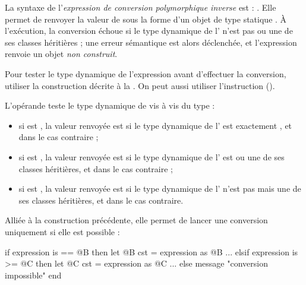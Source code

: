 La syntaxe de l'\emph{expression de conversion polymorphique inverse} est : . Elle permet de renvoyer la valeur de  sous la forme d'un objet de type statique . À l'exécution, la conversion échoue si le type dynamique de l' n'est pas  ou une de ses classes héritières ; une erreur sémantique est alors déclenchée, et l'expression renvoie un objet \emph{non construit}.

Pour tester le type dynamique de l'expression avant d'effectuer la conversion, utiliser la construction décrite à la . On peut aussi utiliser l'instruction  ().








L'opérande  teste le type dynamique de  vis à vis du type  :
\begin{itemize}
\item si  est \galgas{==}, la valeur renvoyée est  si le type dynamique de l' est exactement , et  dans le cas contraire ;
\item si  est \galgas{>=}, la valeur renvoyée est  si le type dynamique de l' est  ou une de ses classes héritières, et  dans le cas contraire ;
\item si  est \galgas{>}, la valeur renvoyée est  si le type dynamique de l' n'est pas  mais une de ses classes héritières, et  dans le cas contraire.
\end{itemize}



Alliée à la construction précédente, elle permet de lancer une conversion uniquement si elle est possible :

\begin{galgascode}
if expression is == @B then
  let @B cst = expression as @B
  ...
elsif expression is >= @C then
  let @C cst = expression as @C
  ...
else
  message "conversion impossible"
end
\end{galgascode}





